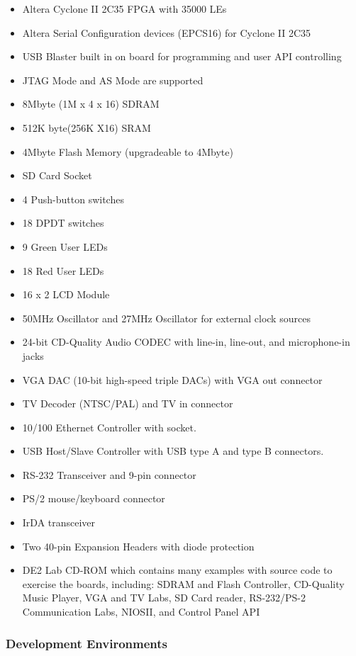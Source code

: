 \documentclass{article}
\begin{document}
\begin{itemize}
\item Altera Cyclone II 2C35 FPGA with 35000 LEs
\item Altera Serial Configuration devices (EPCS16) for Cyclone II 2C35
\item USB Blaster built in on board for programming and user API controlling
\item JTAG Mode and AS Mode are supported
\item 8Mbyte (1M x 4 x 16) SDRAM
\item 512K byte(256K X16) SRAM
\item 4Mbyte Flash Memory (upgradeable to 4Mbyte)
\item SD Card Socket
\item 4 Push-button switches
\item 18 DPDT switches
\item 9 Green User LEDs
\item 18 Red User LEDs
\item 16 x 2 LCD Module
\item 50MHz Oscillator and 27MHz Oscillator for external clock sources
\item 24-bit CD-Quality Audio CODEC with line-in, line-out, and microphone-in jacks
\item VGA DAC (10-bit high-speed triple DACs) with VGA out connector
\item TV Decoder (NTSC/PAL) and TV in connector
\item 10/100 Ethernet Controller with socket.
\item USB Host/Slave Controller with USB type A and type B connectors.
\item RS-232 Transceiver and 9-pin connector
\item PS/2 mouse/keyboard connector
\item IrDA transceiver
\item Two 40-pin Expansion Headers with diode protection
\item DE2 Lab CD-ROM which contains many examples with source code to exercise the boards, including: SDRAM and Flash Controller, CD-Quality Music Player, VGA and TV Labs, SD Card reader, RS-232/PS-2 Communication Labs, NIOSII, and Control Panel API
\end{itemize}

\subsubsection{Development Environments}
\end{document}
